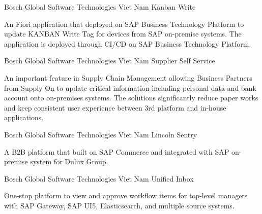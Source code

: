 


\begin{cventries}


\cventry
{Bosch Global Software Technologies Viet Nam}
{Kanban Write}
{}
{}
{
\begin{cvitems}
\item {An Fiori application that deployed on SAP Business Technology Platform to update KANBAN Write Tag for devices from SAP on-premise systems. The application is deployed through CI/CD on SAP Business Technology Platform.}
\end{cvitems}
}


\cventry
{Bosch Global Software Technologies Viet Nam}
{Supplier Self Service}
{}
{}
{
\begin{cvitems}
\item {An important feature in Supply Chain Management allowing Business Partners from Supply-On to update critical information including personal data and bank account onto on-premises systems. The solutions significantly reduce paper works and keep consistent user experience between 3rd platform and in-house applications.}
\end{cvitems}
}


\cventry
{Bosch Global Software Technologies Viet Nam}
{Lincoln Sentry}
{}
{}
{
\begin{cvitems}
\item {A B2B platform that built on SAP Commerce and integrated with SAP on-premise system for Dulux Group.}
\end{cvitems}
}


\cventry
{Bosch Global Software Technologies Viet Nam}
{Unified Inbox}
{}
{}
{
\begin{cvitems}
\item {One-stop platform to view and approve workflow items for top-level managers with SAP Gateway, SAP UI5, Elasticsearch, and multiple source systems.}
\end{cvitems}
}


\end{cventries}
